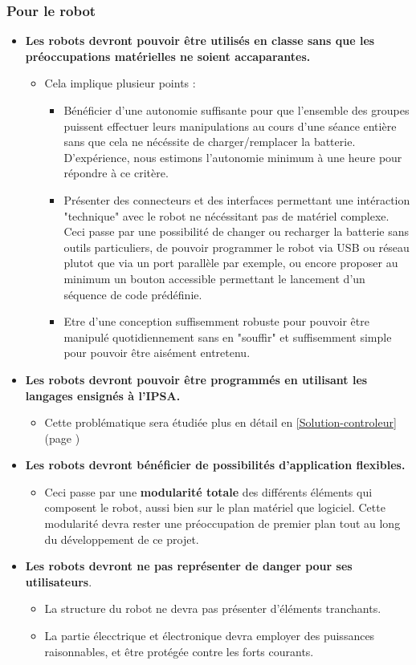 	\subsubsection{Pour le robot}
		\begin{itemize}
			\item \textbf{Les robots devront pouvoir être utilisés en classe sans que les préoccupations matérielles ne soient accaparantes.}
			\begin{itemize}
				\item Cela implique plusieur points :
				\begin{itemize}
					\item Bénéficier d'une autonomie suffisante pour que l'ensemble des groupes puissent effectuer leurs manipulations au cours d'une séance entière sans que cela ne nécéssite de charger/remplacer la batterie. D'expérience, nous estimons l'autonomie minimum à une heure pour répondre à ce critère.
					\item Présenter des connecteurs et des interfaces permettant une intéraction "technique" avec le robot ne nécéssitant pas de matériel complexe. Ceci passe par une possibilité de changer ou recharger la batterie sans outils particuliers, de pouvoir programmer le robot via USB ou réseau plutot que via un port parallèle par exemple, ou encore proposer au minimum un bouton accessible permettant le lancement d'un séquence de code prédéfinie.
					\item Etre d'une conception suffisemment robuste pour pouvoir être manipulé quotidiennement sans en "souffir" et suffisemment simple pour pouvoir être aisément entretenu.
				\end{itemize} 
			\end{itemize}
			\item \textbf{Les robots devront pouvoir être programmés en utilisant les langages ensignés à l'IPSA.}
			\begin{itemize}
				\item Cette problématique sera étudiée plus en détail en \ref{Solution-controleur} (page \pageref{Solution-controleur})
			\end{itemize}
			\item \textbf{Les robots devront bénéficier de possibilités d'application flexibles.}
			\begin{itemize}
				\item Ceci passe par une \textbf{modularité totale} des différents éléments qui composent le robot, aussi bien sur le plan matériel que logiciel. Cette modularité devra rester une préoccupation de premier plan tout au long du développement de ce projet.
			\end{itemize}
			\item \textbf{Les robots devront ne pas représenter de danger pour ses utilisateurs}.
			\begin{itemize}
				\item La structure du robot ne devra pas présenter d'éléments tranchants.
				\item La partie élecctrique et électronique devra employer des puissances raisonnables, et être protégée contre les forts courants.
			\end{itemize}
		\end{itemize}


